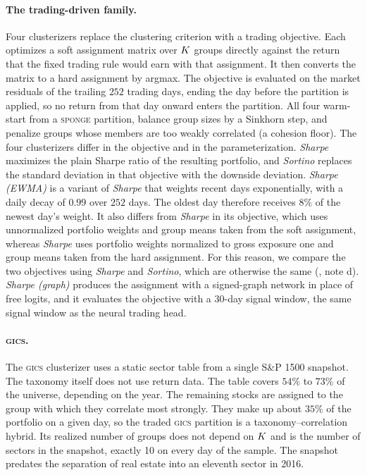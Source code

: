 \paragraph{The trading-driven family.} Four clusterizers replace the
clustering criterion with a trading objective. Each optimizes a soft assignment matrix over $K$ groups directly against the return that the fixed trading rule would earn with that assignment. It then converts the matrix to a hard assignment by argmax. The objective is
evaluated on the market residuals of the trailing $252$ trading days, ending the
day before the partition is applied, so no return from that day
onward enters the partition. All four warm-start from a \textsc{sponge} partition, balance
group sizes by a Sinkhorn step, and penalize groups whose members are
too weakly correlated (a cohesion floor). The four clusterizers
differ in the objective and in the parameterization.
\emph{Sharpe} maximizes the plain Sharpe ratio of the resulting portfolio, and
\emph{Sortino} replaces the standard deviation in that objective with
the downside deviation.
\emph{Sharpe (EWMA)} is a variant of \emph{Sharpe} that weights
recent days exponentially, with a daily decay of $0.99$ over $252$ days. The
oldest day therefore receives $8\%$ of the newest day's weight. It also differs from \emph{Sharpe} in its objective, which uses unnormalized portfolio weights and group means taken from the soft assignment, whereas \emph{Sharpe} uses portfolio weights normalized to gross exposure one and group means taken from the hard assignment. For this reason, we compare the two objectives using \emph{Sharpe} and \emph{Sortino}, which are otherwise the same (, note d).
\emph{Sharpe (graph)} produces the assignment with a signed-graph network in place of free logits, and it evaluates the objective with a 30-day signal window, the same signal window as the neural trading head.

\paragraph{\textsc{gics}.} The \textsc{gics} clusterizer uses a static sector table from a single S\&P
1500 snapshot. The taxonomy itself does not use return data. The table covers $54\%$ to $73\%$ of the universe, depending on the year. The remaining
stocks are
assigned to the group with which they correlate most strongly. They make up about $35\%$ of the portfolio on a given day, so the traded \textsc{gics} partition
is a taxonomy--correlation hybrid. Its realized number
of groups does not depend on $K$ and is the number of sectors in the snapshot, exactly 10 on every
day of the sample. The snapshot predates the separation of
real estate into an eleventh sector in 2016.

